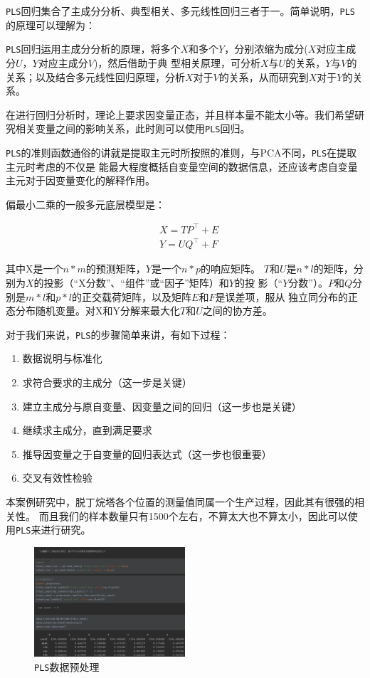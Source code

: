 \documentclass[11pt,a4paper]{elegantpaper}
\begin{document}
\begin{multicols}{2}
\lstinline{PLS}回归集合了主成分分析、典型相关、多元线性回归三者于一。简单说明，\lstinline{PLS}的原理可以理解为：

\lstinline{PLS}回归运用主成分分析的原理，将多个$X$和多个$Y$，分别浓缩为成分($X$对应主成分$U$，$Y$对应主成分$V$)，然后借助于典
型相关原理，可分析$X$与$U$的关系，$Y$与$V$的关系；以及结合多元线性回归原理，分析$X$对于$V$的关系，从而研究到$X$对于$Y$的关系。

在进行回归分析时，理论上要求因变量正态，并且样本量不能太小等。我们希望研究相关变量之间的影响关系，此时则可以使用\lstinline{PLS}回归。

\lstinline{PLS}的准则函数通俗的讲就是提取主元时所按照的准则，与PCA不同，\lstinline{PLS}在提取主元时考虑的不仅是
能最大程度概括自变量空间的数据信息，还应该考虑自变量主元对于因变量变化的解释作用。

偏最小二乘的一般多元底层模型是：

$$
\begin{aligned}
&X=T P^{\top}+E \\
&Y=U Q^{\top}+F
\end{aligned}
$$

其中X是一个$n*m$的预测矩阵，$Y$是一个$n*p$的响应矩阵。
$T$和$U$是$n*l$的矩阵，分别为$X$的投影（“X分数”、“组件”或“因子”矩阵）和$Y$的投
影（“$Y$分数”）。$P$和$Q$分别是$m*l$和$p*l$的正交载荷矩阵，以及矩阵$E$和$F$是误差项，服从
独立同分布的正态分布随机变量。对X和Y分解来最大化$T$和$U$之间的协方差。

对于我们来说，\lstinline{PLS}的步骤简单来讲，有如下过程：

\begin{enumerate}
  \item 数据说明与标准化
  \item 求符合要求的主成分（这一步是关键）
  \item 建立主成分与原自变量、因变量之间的回归（这一步也是关键）
  \item 继续求主成分，直到满足要求
  \item 推导因变量之于自变量的回归表达式（这一步也很重要）
  \item 交叉有效性检验
\end{enumerate}

本案例研究中，脱丁烷塔各个位置的测量值同属一个生产过程，因此其有很强的相关性。
而且我们的样本数量只有1500个左右，不算太大也不算太小，因此可以使用\lstinline{PLS}来进行研究。

\begin{figure}[H]
  \centering
  \includegraphics[width=0.5\textwidth]{images/P.png}
  \caption{\lstinline{PLS}数据预处理} 
\end{figure}


\end{multicols}
\end{document}
